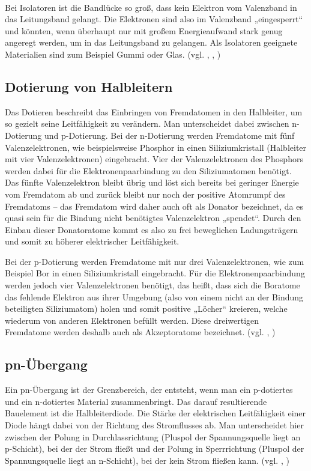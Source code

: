 \documentclass{article}
\begin{document}
~

Bei Isolatoren ist die Bandlücke so groß, dass kein Elektron vom Valenzband in das Leitungsband gelangt. Die Elektronen sind also im Valenzband „eingesperrt“ und könnten, wenn überhaupt nur mit großem Energieaufwand stark genug angeregt werden, um in das Leitungsband zu gelangen. Als Isolatoren geeignete Materialien sind zum Beispiel Gummi oder Glas. (vgl. \cite{moodle}, \cite{cosmos}, \cite{greenlane})


\subsection{Dotierung von Halbleitern}


Das Dotieren beschreibt das Einbringen von Fremdatomen in den Halbleiter, um so gezielt seine Leitfähigkeit zu verändern. Man unterscheidet dabei zwischen n-Dotierung und p-Dotierung.
Bei der n-Dotierung werden Fremdatome mit fünf Valenzelektronen, wie beispielsweise Phosphor in einen Siliziumkristall (Halbleiter mit vier Valenzelektronen) eingebracht. Vier der Valenzelektronen des Phosphors werden dabei für die Elektronenpaarbindung zu den Siliziumatomen benötigt. Das fünfte Valenzelektron bleibt übrig und löst sich bereits bei geringer Energie vom Fremdatom ab und zurück bleibt nur noch der positive Atomrumpf des Fremdatoms – das Fremdatom wird daher auch oft als Donator bezeichnet, da es quasi sein für die Bindung nicht benötigtes Valenzelektron „spendet“. Durch den Einbau dieser Donatoratome kommt es also zu frei beweglichen Ladungsträgern und somit zu höherer elektrischer Leitfähigkeit.

Bei der p-Dotierung werden Fremdatome mit nur drei Valenzelektronen, wie zum Beispiel Bor in einen Siliziumkristall eingebracht. Für die Elektronenpaarbindung werden jedoch vier Valenzelektronen benötigt, das heißt, dass sich die Boratome das fehlende Elektron aus ihrer Umgebung (also von einem nicht an der Bindung beteiligten Siliziumatom) holen und somit positive „Löcher“ kreieren, welche wiederum von anderen Elektronen befüllt werden. Diese dreiwertigen Fremdatome werden deshalb auch als Akzeptoratome bezeichnet. (vgl. \cite{moodle}, \cite{leifiphysik}) 

\subsection{pn-Übergang}

Ein pn-Übergang ist der Grenzbereich, der entsteht, wenn man ein p-dotiertes und ein n-dotiertes Material zusammenbringt. Das darauf resultierende Bauelement ist die Halbleiterdiode. Die Stärke der elektrischen Leitfähigkeit einer Diode hängt dabei von der Richtung des Stromflusses ab. Man unterscheidet hier zwischen der Polung in Durchlassrichtung (Pluspol der Spannungsquelle liegt an p-Schicht), bei der der Strom fließt und der Polung in Sperrrichtung (Pluspol der Spannungsquelle liegt an n-Schicht), bei der kein Strom fließen kann. (vgl. \cite{leifiphysik2}, \cite{kompendium}) 
\end{document}
